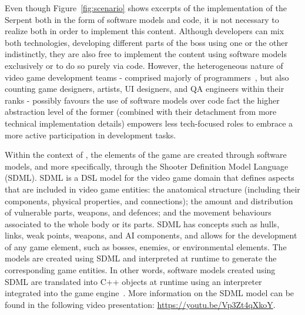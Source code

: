 Even though Figure~\ref{fig:scenario} shows excerpts of the implementation of the Serpent both in the form of software models and code, it is not necessary to realize both in order to implement this content. Although developers can mix both technologies, developing different parts of the boss using one or the other indistinctly, they are also free to implement the content using software models exclusively or to do so purely via code. However, the heterogeneous nature of video game development teams - comprised majorly of programmers~\cite{devNation}, but also counting game designers, artists, UI designers, and QA engineers within their ranks - possibly favours the use of software models over code fact the higher abstraction level of the former (combined with their detachment from more technical implementation details) empowers less tech-focused roles to embrace a more active participation in development tasks. 

Within the context of \CaseStudy{}, the elements of the game are created through software models, and more specifically, through the Shooter Definition Model Language (SDML). SDML is a DSL model for the video game domain that defines aspects that are included in video game entities: the anatomical structure (including their components, physical properties, and connections); the amount and distribution of vulnerable parts, weapons, and defences; and the movement behaviours associated to the whole body or its parts. SDML has concepts such as hulls, links, weak points, weapons, and AI components, and allows for the development of any game element, such as bosses, enemies, or environmental elements. The models are created using SDML and interpreted at runtime to generate the corresponding game entities. In other words, software models created using SDML are translated into C++ objects at runtime using an interpreter integrated into the game engine~\cite{blasco2021evolutionary}. More information on the SDML model can be found in the following video presentation: \url{https://youtu.be/Vp3Zt4qXkoY}.

